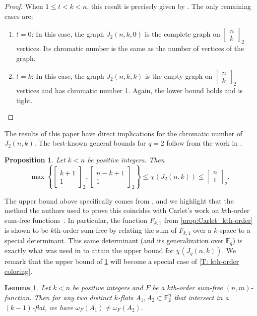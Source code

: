 \documentclass[12pt]{article}
\newtheorem{lem}[thm]{Lemma}
\newtheorem{prop}[thm]{Proposition}
\theoremstyle{definition}
\newcommand{\Gauss}[2]{{\begin{bmatrix} #1 \\ #2 \end{bmatrix}_2}}
\newcommand{\F}{\mathbb F}
\newcounter{numb}
\begin{document}
\begin{proof}
    When $1 \leq t < k < n$, this result is precisely given by \cite[Proposition 3.1]{dhaeseleer2026chromaticnumbergrassmanngraphs}. The only remaining cases are:
    \begin{enumerate}
        \item $t= 0$: In this case, the graph $J_2(n, k, 0)$ is the complete graph on $\Gauss{n}{k}$ vertices. Its chromatic number is the same as the number of vertices of the graph. 
        \item $t = k$: In this case, the graph $J_2(n, k, k)$ is the empty graph on $\Gauss{n}{k}$ vertices and has chromatic number 1. Again, the lower bound holds and is tight. \qedhere
    \end{enumerate} 
\end{proof}
The results of this paper have direct implications for the chromatic number of $J_2(n, k)$. The best-known general bounds for $q = 2$ follow from the work in \cite{dhaeseleer2026chromaticnumbergrassmanngraphs,dhaeseleer2025chromaticnumbergrassmanngraphs}.

\begin{prop}\label{P: bounds_chromatic}
    Let $k < n$ be positive integers. Then
    $$
\max \left\{\Gauss{k+1}{1}, \Gauss{n-k+1}{1} \right \} \leq \chi(J_2(n, k)) \leq \Gauss{n}{1}.
$$
\end{prop}



The upper bound above specifically comes from \cite{dhaeseleer2025chromaticnumbergrassmanngraphs}, and we highlight that the method the authors used to prove this coincides with Carlet's work on $k$th-order sum-free functions~\cite{carlet2025generalizations}. In particular, the function $F_{k, 1}$ from \cref{prop:Carlet_kth-order} is shown to be $k$th-order sum-free by relating the sum of $F_{k,1}$ over a $k$-space to a special determinant. This same determinant (and its generalization over $\F_q$) is exactly what was used in \cite{dhaeseleer2025chromaticnumbergrassmanngraphs} to attain the upper bound for $\chi(J_q(n, k))$. We remark that the upper bound of \cref{P: bounds_chromatic} will become a special case of \cref{T: kth-order coloring}.

\begin{lem}\label{L: kth-order coloring}
    Let $k < n$ be positive integers and $F$ be a $k$th-order sum-free $(n, m)$-function. Then for any two distinct $k$-flats $A_1, A_2 \subset \F_2^n$ that intersect in a $(k-1)$-flat, we have $\omega_F(A_1)\neq \omega_F(A_2)$. 
\end{lem}
\end{document}
